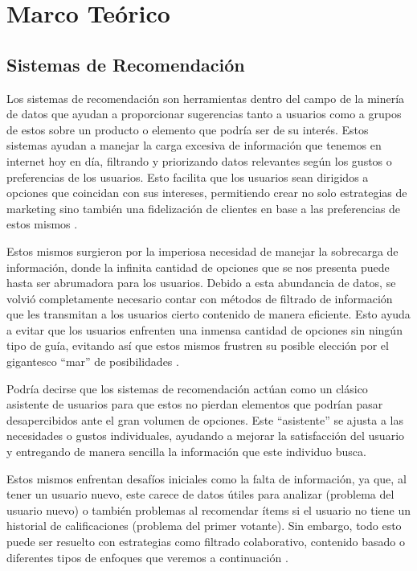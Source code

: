 \chapter{Marco Teórico}\label{chapter:marco_teorico}

\section{Sistemas de Recomendación}\label{sec:sistemas_recomendacion}

Los sistemas de recomendación son herramientas dentro del campo de la minería de datos que ayudan a proporcionar sugerencias tanto a usuarios como a grupos de estos sobre un producto o elemento que podría ser de su interés. Estos sistemas ayudan a manejar la carga excesiva de información que tenemos en internet hoy en día, filtrando y priorizando datos relevantes según los gustos o preferencias de los usuarios. Esto facilita que los usuarios sean dirigidos a opciones que coincidan con sus intereses, permitiendo crear no solo estrategias de marketing sino también una fidelización de clientes en base a las preferencias de estos mismos \parencite{ShahEtAl2016}.

Estos mismos surgieron por la imperiosa necesidad de manejar la sobrecarga de información, donde la infinita cantidad de opciones que se nos presenta puede hasta ser abrumadora para los usuarios. Debido a esta abundancia de datos, se volvió completamente necesario contar con métodos de filtrado de información que les transmitan a los usuarios cierto contenido de manera eficiente. Esto ayuda a evitar que los usuarios enfrenten una inmensa cantidad de opciones sin ningún tipo de guía, evitando así que estos mismos frustren su posible elección por el gigantesco \enquote{mar} de posibilidades \parencite{KoEtAl2022}.

Podría decirse que los sistemas de recomendación actúan como un clásico asistente de usuarios para que estos no pierdan elementos que podrían pasar desapercibidos ante el gran volumen de opciones. Este \enquote{asistente} se ajusta a las necesidades o gustos individuales, ayudando a mejorar la satisfacción del usuario y entregando de manera sencilla la información que este individuo busca.

Estos mismos enfrentan desafíos iniciales como la falta de información, ya que, al tener un usuario nuevo, este carece de datos útiles para analizar (problema del usuario nuevo) o también problemas al recomendar ítems si el usuario no tiene un historial de calificaciones (problema del primer votante). Sin embargo, todo esto puede ser resuelto con estrategias como filtrado colaborativo, contenido basado o diferentes tipos de enfoques que veremos a continuación \parencite{ShahEtAl2016}.


